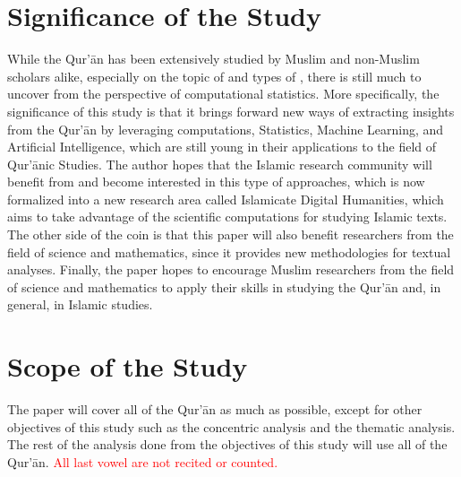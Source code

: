 \section{Significance of the Study}\label{sec:significance}
While the Qur'\=an has been extensively studied by Muslim and non-Muslim scholars alike, especially on the topic of   and   types of  , there is still much to uncover from the perspective of computational statistics. More specifically, the significance of this study is that it brings forward new ways of extracting insights from the Qur'\=an by leveraging computations, Statistics, Machine Learning, and Artificial Intelligence, which are still young in their applications to the field of Qur'\=anic Studies. The author hopes that the Islamic research community will benefit from and become interested in this type of approaches, which is now formalized into a new research area called Islamicate Digital Humanities, which aims to take advantage of the scientific computations for studying Islamic texts. The other side of the coin is that this paper will also benefit researchers from the field of science and mathematics, since it provides new methodologies for textual analyses. Finally, the paper hopes to encourage Muslim researchers from the field of science and mathematics to apply their skills in studying the Qur'\=an and, in general, in Islamic studies.

\section{Scope of the Study}
The paper will cover all   of the Qur'\=an as much as possible, except for other objectives of this study such as the concentric analysis and the thematic analysis. The rest of the analysis done from the objectives of this study will use all   of the Qur'\=an. \textcolor{red}{All last vowel are not recited or counted.}
